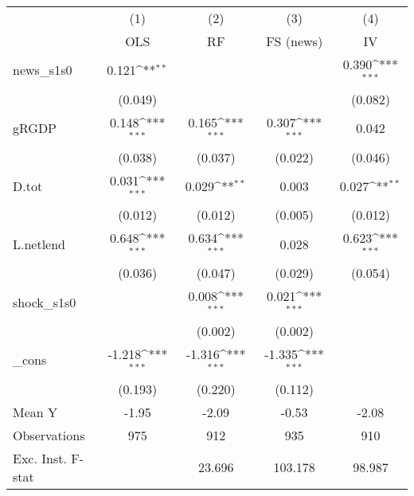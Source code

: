 {
\def\sym#1{\ifmmode^{#1}\else\(^{#1}\)\fi}
\begin{tabular}{l*{4}{c}}
\toprule
            &\multicolumn{1}{c}{(1)}&\multicolumn{1}{c}{(2)}&\multicolumn{1}{c}{(3)}&\multicolumn{1}{c}{(4)}\\
            &\multicolumn{1}{c}{OLS}&\multicolumn{1}{c}{RF}&\multicolumn{1}{c}{FS (news)}&\multicolumn{1}{c}{IV}\\
\midrule
news\_s1s0   &       0.121\sym{**} &                     &                     &       0.390\sym{***}\\
            &     (0.049)         &                     &                     &     (0.082)         \\
\addlinespace
gRGDP       &       0.148\sym{***}&       0.165\sym{***}&       0.307\sym{***}&       0.042         \\
            &     (0.038)         &     (0.037)         &     (0.022)         &     (0.046)         \\
\addlinespace
D.tot       &       0.031\sym{***}&       0.029\sym{**} &       0.003         &       0.027\sym{**} \\
            &     (0.012)         &     (0.012)         &     (0.005)         &     (0.012)         \\
\addlinespace
L.netlend   &       0.648\sym{***}&       0.634\sym{***}&       0.028         &       0.623\sym{***}\\
            &     (0.036)         &     (0.047)         &     (0.029)         &     (0.054)         \\
\addlinespace
shock\_s1s0  &                     &       0.008\sym{***}&       0.021\sym{***}&                     \\
            &                     &     (0.002)         &     (0.002)         &                     \\
\addlinespace
\_cons      &      -1.218\sym{***}&      -1.316\sym{***}&      -1.335\sym{***}&                     \\
            &     (0.193)         &     (0.220)         &     (0.112)         &                     \\
\midrule
Mean Y      &       -1.95         &       -2.09         &       -0.53         &       -2.08         \\
Observations&         975         &         912         &         935         &         910         \\
Exc. Inst. F-stat&                     &      23.696         &     103.178         &      98.987         \\
\bottomrule
\end{tabular}
}
